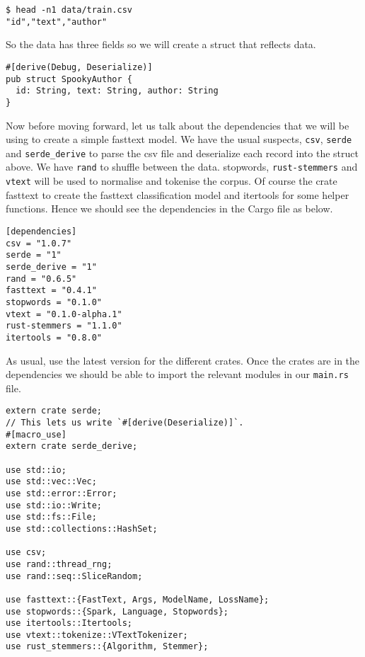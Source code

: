 \documentclass{book}
\begin{document}
\begin{lstlisting}[caption={}, basicstyle=\small]
$ head -n1 data/train.csv
"id","text","author"
\end{lstlisting}

So the data has three fields so we will create a struct that reflects data.

\begin{lstlisting}[caption={chapter5\\/fasttext\\-model\\/src\\/main\\.rs}, basicstyle=\small]
#[derive(Debug, Deserialize)]
pub struct SpookyAuthor {
  id: String, text: String, author: String
}
\end{lstlisting}

Now before moving forward, let us talk about the dependencies that we will be using to create a simple fasttext model. We have the usual suspects, \lstinline{csv}, \lstinline{serde} and \lstinline{serde_derive} to parse the csv file and deserialize each record into the struct above. We have \lstinline{rand} to shuffle between the data. stopwords, \lstinline{rust-stemmers} and \lstinline{vtext} will be used to normalise and tokenise the corpus. Of course the crate fasttext to create the fasttext classification model and itertools for some helper functions. Hence we should see the dependencies in the Cargo file as below.

\begin{lstlisting}[caption={chapter5\\/fasttext\\-model\\/Cargo\\.toml}, basicstyle=\small]
[dependencies]
csv = "1.0.7"
serde = "1"
serde_derive = "1"
rand = "0.6.5"
fasttext = "0.4.1"
stopwords = "0.1.0"
vtext = "0.1.0-alpha.1"
rust-stemmers = "1.1.0"
itertools = "0.8.0"
\end{lstlisting}

As usual, use the latest version for the different crates. Once the crates are in the dependencies we should be able to import the relevant modules in our \lstinline{main.rs} file.

\begin{lstlisting}[caption={chapter5\\/fasttext\\-model\\/src\\/main\\.rs}, basicstyle=\small]
extern crate serde;
// This lets us write `#[derive(Deserialize)]`.
#[macro_use]
extern crate serde_derive;

use std::io;
use std::vec::Vec;
use std::error::Error;
use std::io::Write;
use std::fs::File;
use std::collections::HashSet;

use csv;
use rand::thread_rng;
use rand::seq::SliceRandom;

use fasttext::{FastText, Args, ModelName, LossName};
use stopwords::{Spark, Language, Stopwords};
use itertools::Itertools;
use vtext::tokenize::VTextTokenizer;
use rust_stemmers::{Algorithm, Stemmer};
\end{lstlisting}
\end{document}
